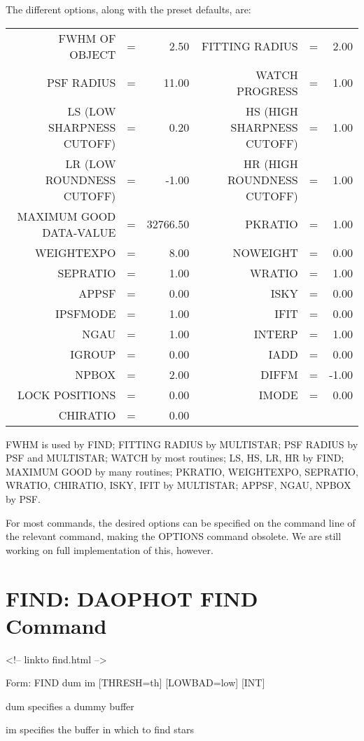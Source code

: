 The different options, along with the preset defaults, are:
\begin{tabular}{rcrrcr}
             FWHM OF OBJECT&=&    2.50&                FITTING RADIUS&=&2.00\\
                 PSF RADIUS&=&   11.00&                WATCH PROGRESS&=&1.00\\
  LS (LOW SHARPNESS CUTOFF)&=&    0.20&    HS (HIGH SHARPNESS CUTOFF)&=&1.00\\
  LR (LOW ROUNDNESS CUTOFF)&=&   -1.00&    HR (HIGH ROUNDNESS CUTOFF)&=&1.00\\
    MAXIMUM GOOD DATA-VALUE&=&32766.50&                       PKRATIO&=&1.00\\
                 WEIGHTEXPO&=&    8.00&                      NOWEIGHT&=&0.00\\
                   SEPRATIO&=&    1.00&                        WRATIO&=&1.00\\
                      APPSF&=&    0.00&                          ISKY&=&0.00\\
                   IPSFMODE&=&    1.00&                          IFIT&=&0.00\\
                       NGAU&=&    1.00&                        INTERP&=&1.00\\
                     IGROUP&=&    0.00&                          IADD&=&0.00\\
                      NPBOX&=&    2.00&                         DIFFM&=&-1.00\\
             LOCK POSITIONS&=&    0.00&                         IMODE&=&0.00\\
                   CHIRATIO&=&    0.00&
\end{tabular}

FWHM is used by FIND; FITTING RADIUS by MULTISTAR; PSF RADIUS by PSF and
MULTISTAR; WATCH by most routines; LS, HS, LR, HR by FIND; MAXIMUM GOOD by
many routines; PKRATIO, WEIGHTEXPO, SEPRATIO, WRATIO, CHIRATIO, ISKY, IFIT by 
MULTISTAR; APPSF, NGAU, NPBOX by PSF.

For most commands, the desired options can be specified on the command line
of the relevant command, making the OPTIONS command obsolete. We are still
working on full implementation of this, however.

\section{FIND: DAOPHOT FIND Command}
\begin{rawhtml}
<!-- linkto find.html -->
\end{rawhtml}
\begin{command}
  \item[Form: FIND dum im {[THRESH=th]} {[LOWBAD=low]} {[INT]}\hfill]{}
  \item[dum]{specifies a dummy buffer}
  \item[im]{specifies the buffer in which to find stars}
\end{command}

